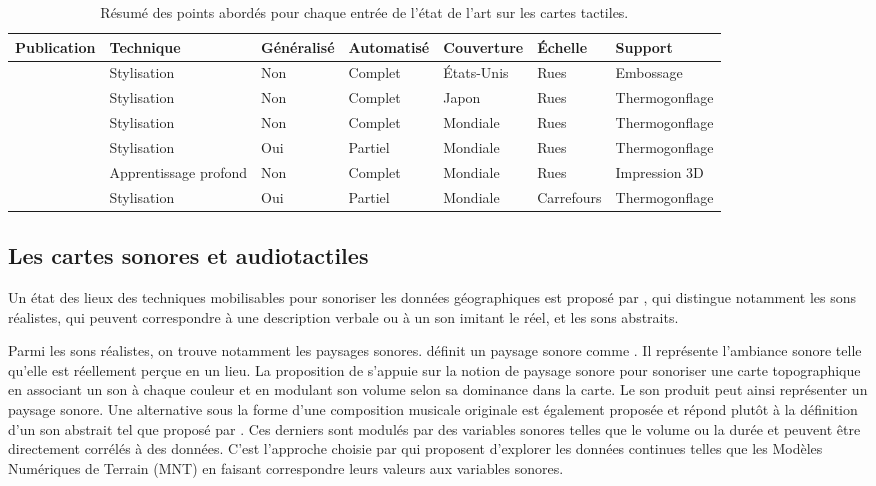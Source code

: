\begin{table}[ht]
\begin{center}
\scriptsize
\begin{tabular}{ | l | l | l | l | l | l | l | }
    Publication & Technique & Généralisé & Automatisé & Couverture & Échelle & Support \tabularnewline
    \hline
    \citep{Miele2004} & Stylisation & Non & Complet & États-Unis & Rues & Embossage \tabularnewline
    \citep{Minatani2010} & Stylisation & Non & Complet & Japon & Rues & Thermogonflage \tabularnewline
    \citep{Watanabe2014, Cervenka2016} & Stylisation & Non & Complet & Mondiale & Rues & Thermogonflage \tabularnewline
    \citep{Stampach2016} & Stylisation & Oui & Partiel & Mondiale & Rues & Thermogonflage \tabularnewline
    \citep{FillieresRiveau2020} & Apprentissage profond & Non & Complet & Mondiale & Rues & Impression 3D \tabularnewline
    \citep{Jiang2023} & Stylisation & Oui & Partiel & Mondiale & Carrefours & Thermogonflage \tabularnewline
\end{tabular}
\end{center}
\caption[Résumé de l'état de l'art sur la génération de cartes en relief]{Résumé des points abordés pour chaque entrée de l'état de l'art sur les cartes tactiles.}
\label{tab:ea_relief}
\end{table}


\label{ea_cartetactile}

\subsection{Les cartes sonores et audiotactiles}

\label{ea_cartessonores}

Un état des lieux des techniques mobilisables pour sonoriser les données géographiques est proposé par \citet{Krygier1994}, qui distingue notamment les sons réalistes, qui peuvent correspondre à une description verbale ou à un son imitant le réel, et les sons abstraits.

\newpar{}


Parmi les sons réalistes, on trouve notamment les paysages sonores. \citet{Porteous1985} définit un paysage sonore comme . Il représente l'ambiance sonore telle qu'elle est réellement perçue en un lieu. La proposition de \citet{Josselin2016} s'appuie sur la notion de paysage sonore pour sonoriser une carte topographique en associant un son à chaque couleur et en modulant son volume selon sa dominance dans la carte. Le son produit peut ainsi représenter un paysage sonore. Une alternative sous la forme d'une composition musicale originale est également proposée et répond plutôt à la définition d'un son abstrait tel que proposé par \citet{Krygier1994}. Ces derniers sont  modulés par des variables sonores telles que le volume ou la durée et peuvent être directement corrélés à des données. C'est l'approche choisie par \citet{Schito2018} qui proposent d'explorer les données continues telles que les Modèles Numériques de Terrain (MNT) en faisant correspondre leurs valeurs aux variables sonores.

